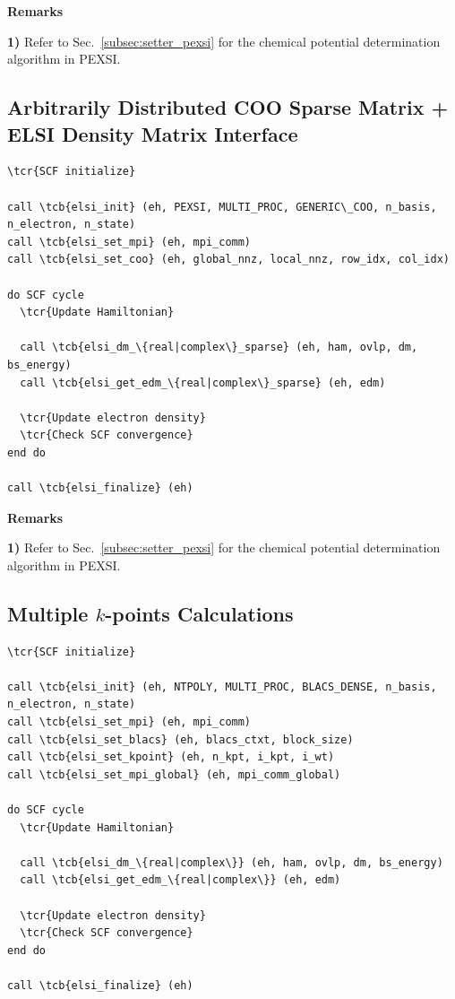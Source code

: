 \documentclass{report}
\newcommand{\tcb}[1]{\textcolor{blue}{#1}}
\newcommand{\tcr}[1]{\textcolor{red}{#1}}
\begin{document}
\textbf{Remarks}

\textbf{1)} Refer to Sec.~\ref{subsec:setter_pexsi} for the chemical potential determination algorithm in PEXSI.

\subsection*{Arbitrarily Distributed COO Sparse Matrix + ELSI Density Matrix Interface}
\begin{tcolorbox}
\begin{Verbatim}[commandchars=\\\{\}]
\tcr{SCF initialize}

call \tcb{elsi_init} (eh, PEXSI, MULTI_PROC, GENERIC\_COO, n_basis, n_electron, n_state)
call \tcb{elsi_set_mpi} (eh, mpi_comm)
call \tcb{elsi_set_coo} (eh, global_nnz, local_nnz, row_idx, col_idx)

do SCF cycle
  \tcr{Update Hamiltonian}

  call \tcb{elsi_dm_\{real|complex\}_sparse} (eh, ham, ovlp, dm, bs_energy)
  call \tcb{elsi_get_edm_\{real|complex\}_sparse} (eh, edm)

  \tcr{Update electron density}
  \tcr{Check SCF convergence}
end do

call \tcb{elsi_finalize} (eh)
\end{Verbatim}
\end{tcolorbox}

\textbf{Remarks}

\textbf{1)} Refer to Sec.~\ref{subsec:setter_pexsi} for the chemical potential determination algorithm in PEXSI.

\subsection*{Multiple $k$-points Calculations}
\begin{tcolorbox}
\begin{Verbatim}[commandchars=\\\{\}]
\tcr{SCF initialize}

call \tcb{elsi_init} (eh, NTPOLY, MULTI_PROC, BLACS_DENSE, n_basis, n_electron, n_state)
call \tcb{elsi_set_mpi} (eh, mpi_comm)
call \tcb{elsi_set_blacs} (eh, blacs_ctxt, block_size)
call \tcb{elsi_set_kpoint} (eh, n_kpt, i_kpt, i_wt)
call \tcb{elsi_set_mpi_global} (eh, mpi_comm_global)

do SCF cycle
  \tcr{Update Hamiltonian}

  call \tcb{elsi_dm_\{real|complex\}} (eh, ham, ovlp, dm, bs_energy)
  call \tcb{elsi_get_edm_\{real|complex\}} (eh, edm)

  \tcr{Update electron density}
  \tcr{Check SCF convergence}
end do

call \tcb{elsi_finalize} (eh)
\end{Verbatim}
\end{tcolorbox}
\end{document}
